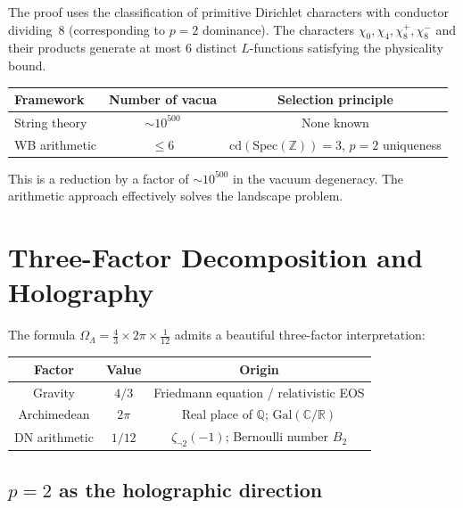 \documentclass[12pt,a4paper]{article}
\theoremstyle{definition}
\newcommand{\Spec}{\mathrm{Spec}}
\newcommand{\cd}{\mathrm{cd}}
\newcommand{\Gal}{\mathrm{Gal}}
\newcommand{\Z}{\mathbb{Z}}
\newcommand{\Q}{\mathbb{Q}}
\newcommand{\R}{\mathbb{R}}
\newcommand{\C}{\mathbb{C}}
\newcommand{\OmL}{\Omega_\Lambda}
\newcommand{\zetanot}{\zeta_{\neg 2}}
\begin{document}
The proof uses the classification of primitive Dirichlet characters with
conductor dividing~$8$ (corresponding to $p=2$ dominance).  The characters
$\chi_0,\chi_4,\chi_8^+,\chi_8^-$ and their products generate at most $6$ distinct
$L$-functions satisfying the physicality bound.

\begin{center}
\begin{tabular}{lcc}
\toprule
\textbf{Framework} & \textbf{Number of vacua} & \textbf{Selection principle} \\
\midrule
String theory      & $\sim 10^{500}$          & None known \\
WB arithmetic      & $\le 6$                  & $\cd(\Spec(\Z))=3$, $p=2$ uniqueness \\
\bottomrule
\end{tabular}
\end{center}

This is a reduction by a factor of $\sim 10^{500}$ in the vacuum degeneracy.
The arithmetic approach effectively solves the landscape problem.

\section{Three-Factor Decomposition and Holography}\label{sec:decomp}

The formula $\OmL=\frac{4}{3}\times 2\pi\times\frac{1}{12}$ admits a beautiful
three-factor interpretation:

\begin{center}
\begin{tabular}{ccc}
\toprule
\textbf{Factor} & \textbf{Value} & \textbf{Origin} \\
\midrule
Gravity        & $4/3$   & Friedmann equation / relativistic EOS \\
Archimedean    & $2\pi$  & Real place of $\Q$; $\Gal(\C/\R)$ \\
DN arithmetic  & $1/12$  & $\zetanot(-1)$; Bernoulli number $B_2$ \\
\bottomrule
\end{tabular}
\end{center}

\subsection{$p=2$ as the holographic direction}
\end{document}
